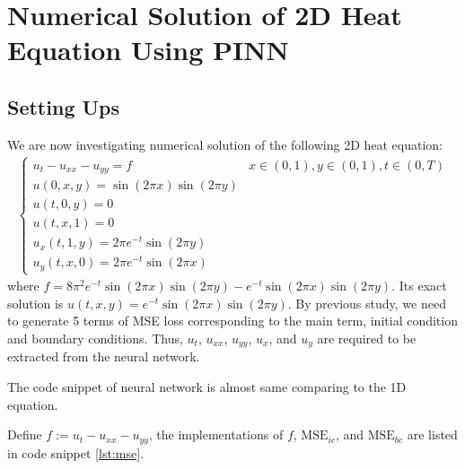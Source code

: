\documentclass[11pt, a4paper]{article}
\begin{document}
    \section{Numerical Solution of 2D Heat Equation Using PINN}
    \subsection{Setting Ups}

    We are now investigating numerical solution of the following 2D heat equation:
    \begin{align}
        \begin{cases}
                u_{t}-u_{x x}-u_{y y}=f & x\in (0,1), y\in (0,1), t\in (0,T)\\
                u(0, x, y)=\sin (2 \pi x) \sin (2 \pi y) &\\
                u(t, 0, y)=0 &\\
                u(t, x, 1)=0 &\\
                u_{x}(t, 1, y)=2 \pi e^{-t} \sin (2 \pi y) &\\
                u_{y}(t, x, 0)=2 \pi e^{-t} \sin (2 \pi x) &
        \end{cases}
    \end{align}
    where $f=8\pi^2e^{-t}\sin(2\pi x)\sin(2\pi y)-e^{-t}\sin(2\pi x)\sin(2\pi y)$.
    Its exact solution is $u(t,x,y)=e^{-t}\sin(2\pi x)\sin(2\pi y)$.
    By previous study, we need to generate 5 terms of MSE loss corresponding to the main term, initial condition and boundary conditions. 
    Thus, $u_t$, $u_{xx}$, $u_{yy}$, $u_{x}$, and $u_{y}$ are required to be extracted from the neural network.

    The code snippet of neural network is almost same comparing to the 1D equation.

    Define $f:=u_t-u_{xx}-u_{yy}$, the implementations of $f$, $\text{MSE}_{ic}$, and $\text{MSE}_{bc}$ are listed in code snippet \ref{lst:mse}.
\end{document}
